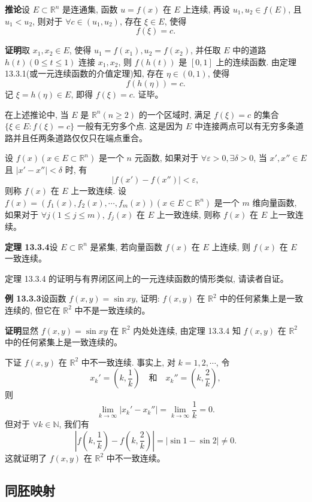 \documentclass[UTF8, 12pt, fontset=fandol, oneside]{ctexart}
\begin{document}
\noindent\textbf{推论}\quad 设 $E\subset\mathbb R^n$ 是连通集, 函数 $u=f(x)$ 在 $E$ 上连续, 再设 $u_1,u_2\in f(E)$, 且 $u_1<u_2$, 则对于 $\forall c\in(u_1,u_2)$, 存在 $\xi\in E$, 使得
\[
  f(\xi)=c.
\]

\noindent\textbf{证明}\quad 取 $x_1,x_2\in E$, 使得 $u_1=f(x_1),u_2=f(x_2)$, 并任取 $E$ 中的道路 $h(t)(0\le t\le1)$ 连接 $x_1,x_2$, 则 $f(h(t))$ 是 $[0,1]$ 上的连续函数. 由定理 13.3.1(或一元连续函数的介值定理)知, 存在 $\eta\in(0,1)$, 使得
\[
  f(h(\eta))=c.
\]
记 $\xi=h(\eta)\in E$, 即得 $f(\xi)=c$. 证毕。

在上述推论中, 当 $E$ 是 $\mathbb R^n(n\ge2)$ 的一个区域时, 满足 $f(\xi)=c$ 的集合 $\{\xi\in E:f(\xi)=c\}$ 一般有无穷多个点. 这是因为 $E$ 中连接两点可以有无穷多条道路并且任两条道路仅仅只在端点重合。

设 $f(x)(x\in E\subset\mathbb R^n)$ 是一个 $n$ 元函数, 如果对于 $\forall\varepsilon>0,\exists\delta>0$, 当 $x',x''\in E$ 且 $|x'-x''|<\delta$ 时, 有
\[
  |f(x')-f(x'')|<\varepsilon,
\]
则称 $f(x)$ 在 $E$ 上一致连续. 设 $f(x)=(f_1(x),f_2(x),\cdots,f_m(x))(x\in E\subset\mathbb R^n)$ 是一个 $m$ 维向量函数, 如果对于 $\forall j(1\le j\le m)$, $f_j(x)$ 在 $E$ 上一致连续, 则称 $f(x)$ 在 $E$ 上一致连续。

\noindent\textbf{定理 13.3.4}\quad 设 $E\subset\mathbb R^n$ 是紧集, 若向量函数 $f(x)$ 在 $E$ 上连续, 则 $f(x)$ 在 $E$ 一致连续。

定理 13.3.4 的证明与有界闭区间上的一元连续函数的情形类似, 请读者自证。

\noindent\textbf{例 13.3.3}\quad 设函数 $f(x,y)=\sin xy$, 证明: $f(x,y)$ 在 $\mathbb R^2$ 中的任何紧集上是一致连续的, 但它在 $\mathbb R^2$ 中不是一致连续的。

\noindent\textbf{证明}\quad 显然 $f(x,y)=\sin xy$ 在 $\mathbb R^2$ 内处处连续, 由定理 13.3.4 知 $f(x,y)$ 在 $\mathbb R^2$ 中的任何紧集上是一致连续的。

下证 $f(x,y)$ 在 $\mathbb R^2$ 中不一致连续. 事实上, 对 $k=1,2,\cdots$, 令
\[
  x_k'=\left(k,\frac1k\right)\quad\text{和}\quad
  x_k''=\left(k,\frac2k\right),
\]
则
\[
  \lim_{k\to\infty}|x_k'-x_k''|=\lim_{k\to\infty}\frac1k=0.
\]
但对于 $\forall k\in\mathbb N$, 我们有
\[
  \left|f\left(k,\frac1k\right)-f\left(k,\frac2k\right)\right|
  =|\sin1-\sin2|\ne0.
\]
这就证明了 $f(x,y)$ 在 $\mathbb R^2$ 中不一致连续。

\subsection{同胚映射}
\end{document}
